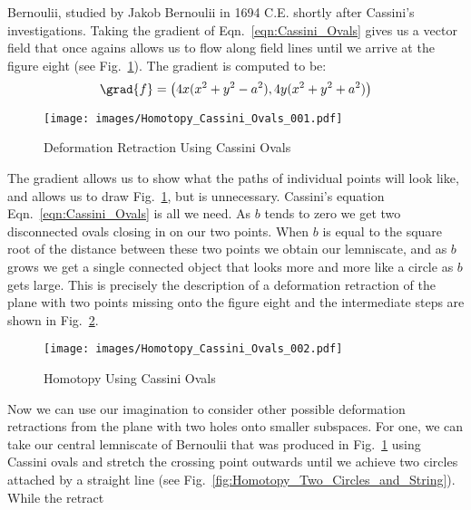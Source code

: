 \documentclass{article}                                                        %
\begin{document}
        Bernoulii, studied by Jakob Bernoulii in 1694 C.E. shortly after
        Cassini's investigations. Taking the gradient of
        Eqn.~\ref{eqn:Cassini_Ovals} gives us a vector field that once agains
        allows us to flow along field lines until we arrive at the figure eight
        (see Fig.~\ref{fig:Deformation_Retraction_Cassini_Ovals}). The gradient
        is computed to be:
        \begin{equation}
            \grad{f}=\big(4x(x^{2}+y^{2}-a^{2}), 4y(x^{2}+y^{2}+a^2)\big)
        \end{equation}
        \begin{figure}[H]
            \centering
            \captionsetup{type=figure}
            \texttt{[image: images/Homotopy\_Cassini\_Ovals\_001.pdf]}
            \caption{Deformation Retraction Using Cassini Ovals}
            \label{fig:Deformation_Retraction_Cassini_Ovals}
        \end{figure}
        The gradient allows us to show what the paths of individual points will
        look like, and allows us to draw
        Fig.~\ref{fig:Deformation_Retraction_Cassini_Ovals}, but is unnecessary.
        Cassini's equation Eqn.~\ref{eqn:Cassini_Ovals} is all we need. As
        $b$ tends to zero we get two disconnected ovals closing in on our two
        points. When $b$ is equal to the square root of the distance between
        these two points we obtain our lemniscate, and as $b$ grows we get a
        single connected object that looks more and more like a circle as $b$
        gets large. This is precisely the description of a deformation
        retraction of the plane with two points missing onto the figure eight
        and the intermediate steps are shown in
        Fig.~\ref{fig:Homotopy_Cassini_Ovals}.
        \begin{figure}[H]
            \centering
            \captionsetup{type=figure}
            \texttt{[image: images/Homotopy\_Cassini\_Ovals\_002.pdf]}
            \caption{Homotopy Using Cassini Ovals}
            \label{fig:Homotopy_Cassini_Ovals}
        \end{figure}
        Now we can use our imagination to consider other possible deformation
        retractions from the plane with two holes onto smaller subspaces. For
        one, we can take our central lemniscate of Bernoulii that was produced
        in Fig.~\ref{fig:Deformation_Retraction_Cassini_Ovals} using Cassini
        ovals and stretch the crossing point outwards until we achieve two
        circles attached by a straight line
        (see Fig.~\ref{fig:Homotopy_Two_Circles_and_String}). While the retract
\end{document}
